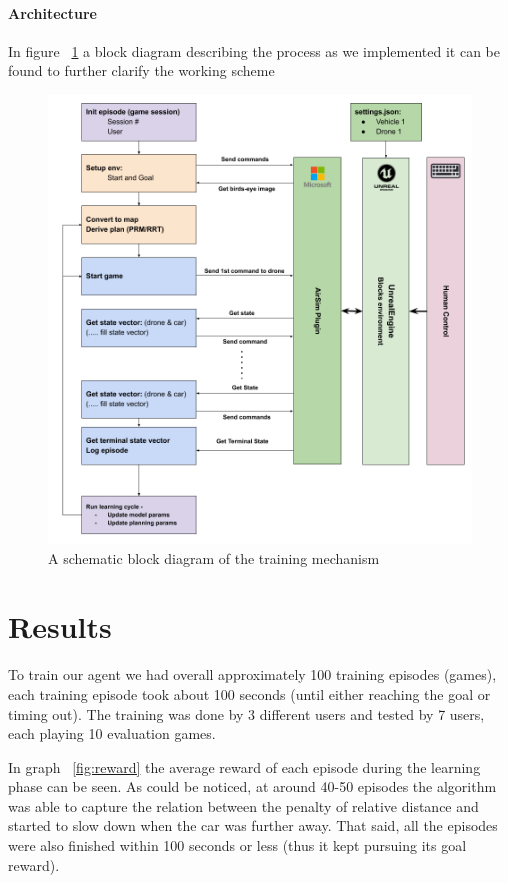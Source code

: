 \documentclass[a4paper,11pt]{article}
\begin{document}
\newpage
\paragraph{Architecture} In figure ~\ref{fig:Architecture} a block diagram describing the process as we implemented it can be found to further clarify the working scheme 

\begin{figure}[!h]
    \centering
    \includegraphics[width=.7\textwidth]{GuidanceDrone_Architecture.png}
    \caption{A schematic block diagram of the training mechanism}
    \label{fig:Architecture}
\end{figure}




\section{Results}

To train our agent we had overall approximately 100 training episodes (games), each training episode took about 100 seconds (until either reaching the goal or timing out). The training was done by 3 different users and tested by 7 users, each playing 10 evaluation games.

In graph ~\ref{fig:reward} the average reward of each episode during the learning phase can be seen. As could be noticed, at around 40-50 episodes the algorithm was able to capture the relation between the penalty of relative distance and started to slow down when the car was further away. That said, all the episodes were also finished within 100 seconds or less (thus it kept pursuing its goal reward). \\
\end{document}
